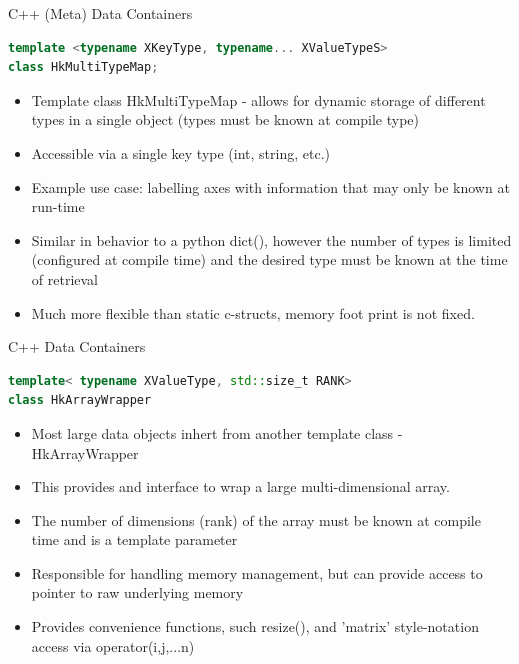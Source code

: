 \documentclass[xcolor=svgnames]{beamer}
\begin{document}
\begin{frame}[fragile]{C++ (Meta) Data Containers}

\begin{lstlisting}[language=C++,basicstyle=\ttfamily\tiny,keywordstyle=\color{red}]
template <typename XKeyType, typename... XValueTypeS>
class HkMultiTypeMap;
\end{lstlisting}

\begin{itemize}
\item Template class HkMultiTypeMap - allows for dynamic storage of different types in a single object (types must be known at compile type)
\item Accessible via a single key type (int, string, etc.)
\item Example use case: labelling axes with information that may only be known at run-time
\item Similar in behavior to a python dict(), however the number of types is limited (configured at compile time) and the desired type
must be known at the time of retrieval
\item Much more flexible than static c-structs, memory foot print is not fixed.
\end{itemize}
 
\end{frame}

\begin{frame}[fragile]{C++ Data Containers}

\begin{lstlisting}[language=C++,basicstyle=\ttfamily\tiny,keywordstyle=\color{red}]
template< typename XValueType, std::size_t RANK> 
class HkArrayWrapper
\end{lstlisting}

\begin{itemize}
\item Most large data objects inhert from another template class - HkArrayWrapper
\item This provides and interface to wrap a large multi-dimensional array.
\item The number of dimensions (rank) of the array must be known at compile time and is a template parameter
\item Responsible for handling memory management, but can provide access to pointer to raw underlying memory
\item Provides convenience functions, such resize(), and 'matrix' style-notation access via operator(i,j,...n)
\end{itemize}

\end{frame}
\end{document}
